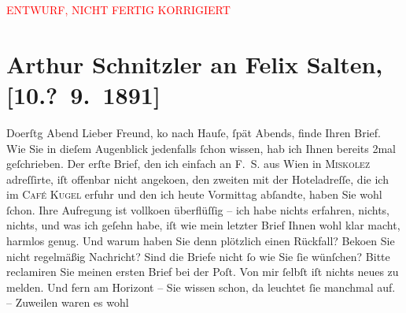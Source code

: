 
\begin{center}
            \textcolor{red}{ENTWURF, NICHT FERTIG KORRIGIERT}
                      \end{center}
            
         
         \renewcommand{\erwaehntePersonen}{Personen: Felix Salten}
         \renewcommand{\erwaehnteOrte}{Orte: Café Kugel, Miskolc, Wien}
         \renewcommand{\erwaehnteWerke}{Werke: ?? [Drama über Offizier, der Partnerin eines Untergebenen verführt]}
               \section[Arthur Schnitzler an Felix Salten, {[}10.? 9. 1891{]}]{ Arthur Schnitzler an Felix Salten, {[}10.? 9. 1891{]}}\nopagebreak{}\rehead{ }\begin{ledgroupsized}[t]{13cm}\normalsize\beginnumbering \toendnotes[C]{\smallbreak\pagebreak[2]} 
\toendnotes[C]{\smallbreak}\pstart
           \raggedleft{}{\pb}Do{\geminationn}erſtg{ }Abend\pend
           \pstart
           Lieber Freund, ko{\geminationm} nach Hauſe, ſpät
               Abends, finde Ihren Brief. Wie Sie in dieſem Augenblick jedenfalls ſchon wissen, hab
               ich Ihnen bereits 2mal geſchrieben. Der erſte {\pb}Brief, den ich einfach an F. S. aus Wien in \textsc{Miskolez} adreſſirte, iſt offenbar nicht angeko{\geminationm}en, den
               zweiten mit der Hoteladreſſe, die ich im \textsc{Café Kugel} erfuhr und den ich heute Vormittag abſandte, haben Sie wohl ſchon. Ihre
               Aufregung ist vollko{\geminationm}en {\pb}überflüſſig – ich habe nichts erfahren,
               nichts, nichts, und was ich geſehn habe, iſt wie mein letzter Brief Ihnen wohl klar
               macht, harmlos genug. Und warum haben Sie denn plötzlich einen Rückfall? Beko{\geminationm}en­ Sie nicht regelmäßig Nachricht? {\pb}Sind die Briefe nicht ſo wie Sie ſie
               wünſchen? Bitte reclamiren Sie meinen ersten Brief bei der Poſt. Von mir ſelbſt iſt
               nichts neues zu melden. Und fern am Horizont – Sie wissen schon, da leuchtet {\pb}ſie manchmal auf. – Zuweilen waren es wohl

\end{ledgroupsized}
